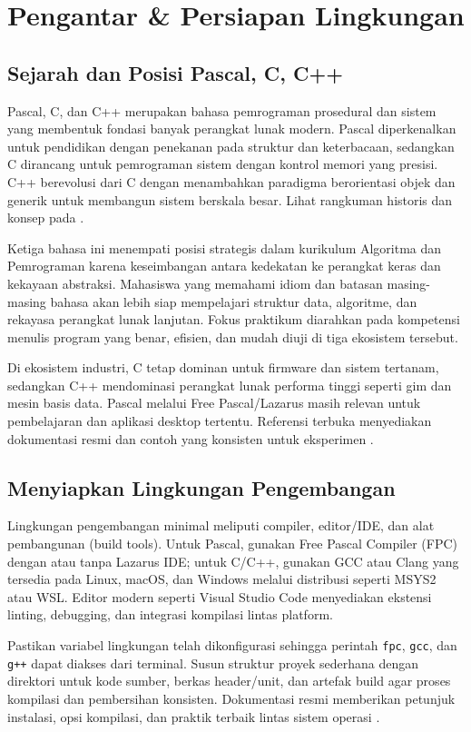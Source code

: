 \documentclass[../main.tex]{subfiles}
\begin{document}
\chapter{Pengantar \& Persiapan Lingkungan}
\section{Sejarah dan Posisi Pascal, C, C++}
Pascal, C, dan C++ merupakan bahasa pemrograman prosedural dan sistem yang membentuk fondasi banyak perangkat lunak modern. Pascal diperkenalkan untuk pendidikan dengan penekanan pada struktur dan keterbacaan, sedangkan C dirancang untuk pemrograman sistem dengan kontrol memori yang presisi. C++ berevolusi dari C dengan menambahkan paradigma berorientasi objek dan generik untuk membangun sistem berskala besar. Lihat rangkuman historis dan konsep pada \textcite{pascal-tutorial-wikibooks,gnu-c-manual,cpp-reference}.

Ketiga bahasa ini menempati posisi strategis dalam kurikulum Algoritma dan Pemrograman karena keseimbangan antara kedekatan ke perangkat keras dan kekayaan abstraksi. Mahasiswa yang memahami idiom dan batasan masing-masing bahasa akan lebih siap mempelajari struktur data, algoritme, dan rekayasa perangkat lunak lanjutan. Fokus praktikum diarahkan pada kompetensi menulis program yang benar, efisien, dan mudah diuji di tiga ekosistem tersebut.

Di ekosistem industri, C tetap dominan untuk firmware dan sistem tertanam, sedangkan C++ mendominasi perangkat lunak performa tinggi seperti gim dan mesin basis data. Pascal melalui Free Pascal/Lazarus masih relevan untuk pembelajaran dan aplikasi desktop tertentu. Referensi terbuka menyediakan dokumentasi resmi dan contoh yang konsisten untuk eksperimen \parencite{free-pascal-docs,gnu-c-manual,cpp-reference}.

\section{Menyiapkan Lingkungan Pengembangan}
Lingkungan pengembangan minimal meliputi compiler, editor/IDE, dan alat pembangunan (build tools). Untuk Pascal, gunakan Free Pascal Compiler (FPC) dengan atau tanpa Lazarus IDE; untuk C/C++, gunakan GCC atau Clang yang tersedia pada Linux, macOS, dan Windows melalui distribusi seperti MSYS2 atau WSL. Editor modern seperti Visual Studio Code menyediakan ekstensi linting, debugging, dan integrasi kompilasi lintas platform.

Pastikan variabel lingkungan telah dikonfigurasi sehingga perintah \texttt{fpc}, \texttt{gcc}, dan \texttt{g++} dapat diakses dari terminal. Susun struktur proyek sederhana dengan direktori untuk kode sumber, berkas header/unit, dan artefak build agar proses kompilasi dan pembersihan konsisten. Dokumentasi resmi memberikan petunjuk instalasi, opsi kompilasi, dan praktik terbaik lintas sistem operasi \parencite{free-pascal-docs,gnu-c-manual,cpp-reference}.
\end{document}
